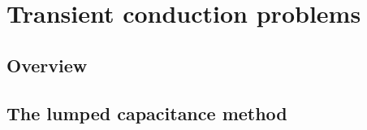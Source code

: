 \chapter{Transient conduction problems}
\section{Overview}
\section{The lumped capacitance method}


